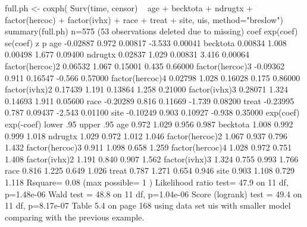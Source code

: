 full.ph <- coxph( Surv(time, censor) ~ age + becktota + ndrugtx + factor(hercoc)
                  + factor(ivhx) + race + treat + site,  uis, method="breslow")
summary(full.ph)
  n=575 (53 observations deleted due to missing)
                    coef exp(coef) se(coef)      z       p
age             -0.02887     0.972  0.00817 -3.533 0.00041
becktota         0.00834     1.008  0.00498  1.677 0.09400
ndrugtx          0.02837     1.029  0.00831  3.416 0.00064
factor(hercoc)2  0.06532     1.067  0.15001  0.435 0.66000
factor(hercoc)3 -0.09362     0.911  0.16547 -0.566 0.57000
factor(hercoc)4  0.02798     1.028  0.16028  0.175 0.86000
factor(ivhx)2    0.17439     1.191  0.13864  1.258 0.21000
factor(ivhx)3    0.28071     1.324  0.14693  1.911 0.05600
race            -0.20289     0.816  0.11669 -1.739 0.08200
treat           -0.23995     0.787  0.09437 -2.543 0.01100
site            -0.10249     0.903  0.10927 -0.938 0.35000
                exp(coef) exp(-coef) lower .95 upper .95
age                 0.972      1.029     0.956     0.987
becktota            1.008      0.992     0.999     1.018
ndrugtx             1.029      0.972     1.012     1.046
factor(hercoc)2     1.067      0.937     0.796     1.432
factor(hercoc)3     0.911      1.098     0.658     1.259
factor(hercoc)4     1.028      0.972     0.751     1.408
factor(ivhx)2       1.191      0.840     0.907     1.562
factor(ivhx)3       1.324      0.755     0.993     1.766
race                0.816      1.225     0.649     1.026
treat               0.787      1.271     0.654     0.946
site                0.903      1.108     0.729     1.118
Rsquare= 0.08   (max possible= 1 )
Likelihood ratio test= 47.9  on 11 df,   p=1.48e-06
Wald test            = 48.8  on 11 df,   p=1.04e-06
Score (logrank) test = 49.4  on 11 df,   p=8.17e-07
Table 5.4 on page 168 using data set uis with smaller model comparing with the previous example.

